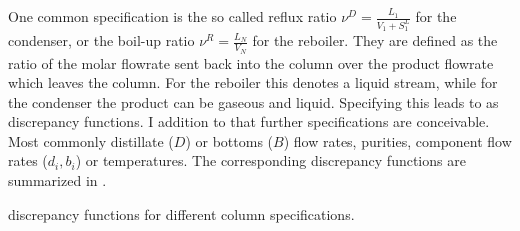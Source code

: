         One common specification is the so called reflux ratio $\nu^D = \frac{L_1}{V_1 + S_1^L}$ for
        the condenser, or the boil-up ratio $\nu^R = \frac{L_N}{V_N}$ for the reboiler.
        They are defined as the ratio of the molar flowrate sent back into the column over the
        product flowrate which leaves the column. For the reboiler this denotes a liquid stream,
        while for the condenser the product can be gaseous and liquid. Specifying this leads to
        as discrepancy functions. I addition to that further specifications are conceivable. Most
        commonly distillate ($D$) or bottoms ($B$) flow rates, purities, component flow rates ($d_i, b_i$)
        or temperatures. The corresponding discrepancy functions are summarized in .

        \begin{table}
            \centering
            \footnotesize
            
            \caption{discrepancy functions for different column specifications.}
            \label{tab:discrepancy}
        \end{table}

